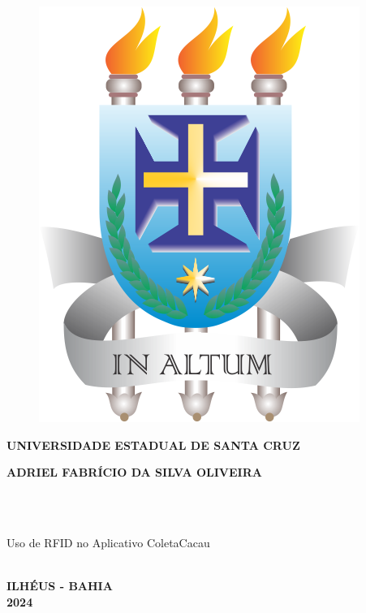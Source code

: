 \thispagestyle{empty}

\vfill
 \begin{center}
    \begin{figure}
        \centering
        \includegraphics[scale=0.35]{images/brasao-uesc.png} 
    \end{figure}
    {\large\bfseries UNIVERSIDADE ESTADUAL DE SANTA CRUZ} \\
    \vspace*{1in}
    \begin{large} \bfseries ADRIEL FABRÍCIO DA SILVA OLIVEIRA \end{large}\\[0.4in]
    \vspace*{4cm}
    \noindent \\
    \large\bfseries{\begin{large}Uso de RFID no Aplicativo ColetaCacau \end{large}} \\
    \vfill
    \large\bfseries{ ILHÉUS - BAHIA \\ 2024}
\end{center}

\normalsize


